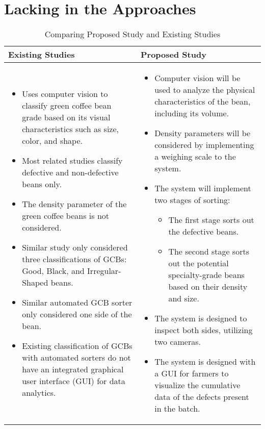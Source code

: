 \section{Lacking in the Approaches}

\begin{center}
	\begin{longtable}{| p{7cm} | p{7cm} |}
		\caption{Comparing Proposed Study and Existing Studies} 
		\label{tab:comparing_study}
		\endfirsthead
		\endhead
		\hline
		
		\textbf{Existing Studies} & \textbf{Proposed Study} \\ 
		\hline
		\begin{itemize}
			\item Uses computer vision to classify green coffee bean grade based on its visual characteristics such as size, color, and shape.
			\item Most related studies classify defective and non-defective beans only.
			\item The density parameter of the green coffee beans is not considered.
			\item Similar study \cite{Lualhati_Mariano_Torres_Fenol_2022} only considered three classifications of GCBs: Good, Black, and Irregular-Shaped beans.
			\item Similar automated GCB sorter \cite{Balay_Cabrera_Jensen_Mayuga_2024} only considered one side of the bean.
			\item Existing classification of GCBs with automated sorters do not have an integrated graphical user interface (GUI) for data analytics.
		\end{itemize}
		&
		\begin{itemize}
			\item Computer vision will be used to analyze the physical characteristics of the bean, including its volume.
			\item Density parameters will be considered by implementing a weighing scale to the system.
			\item The system will implement two stages of sorting:
			\begin{itemize}
				\item The first stage sorts out the defective beans.
				\item The second stage sorts out the potential specialty-grade beans based on their density and size.
			\end{itemize}
			\item The system is designed to inspect both sides, utilizing two cameras.
			\item The system is designed with a GUI for farmers to visualize the cumulative data of the defects present in the batch.
		\end{itemize}
		\\ \hline			
	\end{longtable}
\end{center}

